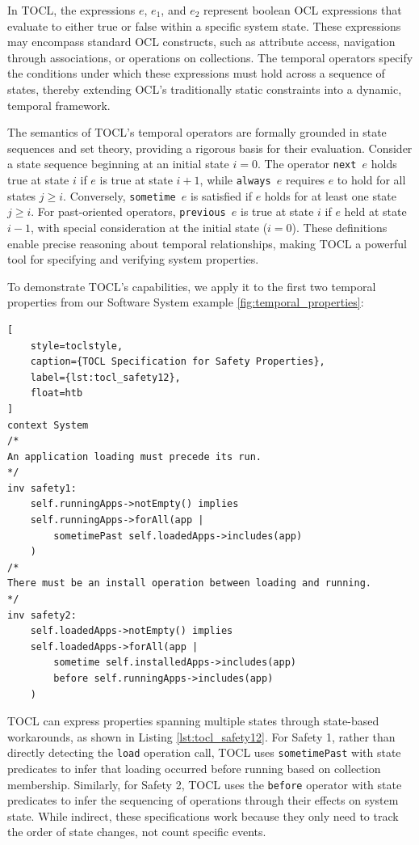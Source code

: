 In TOCL, the expressions $e$, $e_1$, and $e_2$ represent boolean OCL expressions 
that evaluate to either true or false within a specific system state. These 
expressions may encompass standard OCL constructs, such as attribute access, 
navigation through associations, or operations on collections. The temporal 
operators specify the conditions under which these expressions must hold across 
a sequence of states, thereby extending OCL's traditionally static constraints 
into a dynamic, temporal framework.

The semantics of TOCL's temporal operators are formally grounded in state sequences 
and set theory, providing a rigorous basis for their evaluation. Consider a state 
sequence beginning at an initial state $i = 0$. The operator \texttt{next $e$} holds 
true at state $i$ if $e$ is true at state $i+1$, while \texttt{always $e$} requires 
$e$ to hold for all states $j \geq i$. Conversely, \texttt{sometime $e$} is satisfied 
if $e$ holds for at least one state $j \geq i$. For past-oriented operators, 
\texttt{previous $e$} is true at state $i$ if $e$ held at state $i-1$, with special 
consideration at the initial state ($i = 0$). These definitions enable precise 
reasoning about temporal relationships, making TOCL a powerful tool for specifying 
and verifying system properties.

To demonstrate TOCL's capabilities, we apply it to the first two temporal properties 
from our Software System example \ref{fig:temporal_properties}:

\begin{lstlisting}[
    style=toclstyle, 
    caption={TOCL Specification for Safety Properties}, 
    label={lst:tocl_safety12},
    float=htb
]
context System 
/*
An application loading must precede its run.
*/
inv safety1: 
    self.runningApps->notEmpty() implies 
    self.runningApps->forAll(app | 
        sometimePast self.loadedApps->includes(app)
    )
/*
There must be an install operation between loading and running.
*/
inv safety2: 
    self.loadedApps->notEmpty() implies 
    self.loadedApps->forAll(app | 
        sometime self.installedApps->includes(app) 
        before self.runningApps->includes(app)
    )
\end{lstlisting}

TOCL can express properties spanning multiple states through state-based workarounds, as shown in Listing \ref{lst:tocl_safety12}. For Safety 1, rather than directly detecting the \texttt{load} operation call, TOCL uses \texttt{sometimePast} with state predicates to infer that loading occurred before running based on collection membership. Similarly, for Safety 2, TOCL uses the \texttt{before} operator with state predicates to infer the sequencing of operations through their effects on system state. While indirect, these specifications work because they only need to track the order of state changes, not count specific events.

